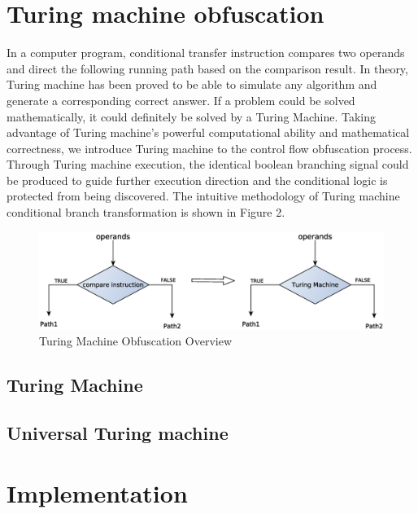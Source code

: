 \documentclass[lnicst]{svmultln}
\begin{document}
%
\section{Turing machine obfuscation}
%
In a computer program, conditional transfer instruction compares two operands and direct the following running path based on the comparison result. In theory, Turing machine has been proved to be able to simulate any algorithm and generate a corresponding correct answer. If a problem could be solved mathematically, it could definitely be solved by a Turing Machine. Taking advantage of Turing machine's powerful computational ability and mathematical correctness, we introduce Turing machine to the control flow obfuscation process. Through Turing machine execution, the identical boolean branching signal could be produced to guide further execution direction and the conditional logic is protected from being discovered. The intuitive methodology of Turing machine conditional branch transformation is shown in Figure 2.
\begin{figure}
 \includegraphics[width=\linewidth]{figure2.eps}
 \caption{Turing Machine Obfuscation Overview}
 \label{Figure 2}
\end{figure}
\subsection{Turing Machine}

\subsection{Universal Turing machine}

\section{Implementation}
\end{document}
